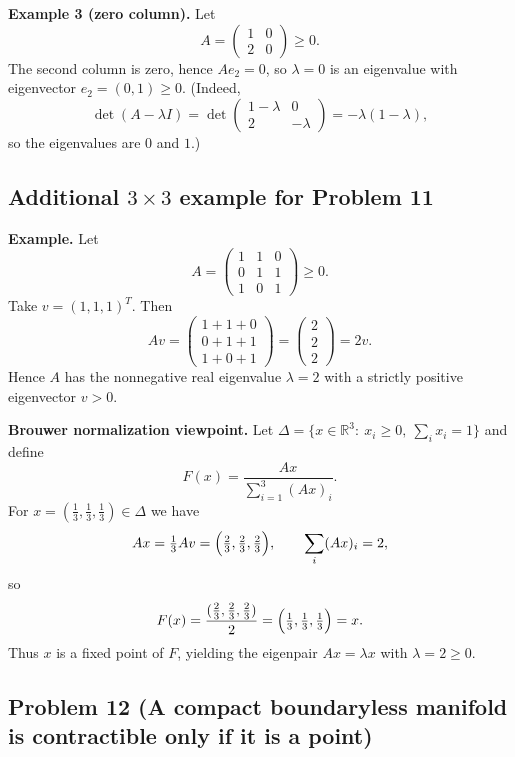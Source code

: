 \documentclass[12pt,a4paper]{article}
\theoremstyle{plain}
\theoremstyle{definition}      %
\begin{document}
\medskip
\noindent\textbf{Example 3 (zero column).}
Let
\[
A=\begin{pmatrix}1&0\\2&0\end{pmatrix}\ge 0.
\]
The second column is zero, hence $Ae_2=0$, so $\lambda=0$ is an eigenvalue with eigenvector $e_2=(0,1)\ge 0$.
(Indeed,
\[
\det(A-\lambda I)=\det\begin{pmatrix}1-\lambda&0\\2&-\lambda\end{pmatrix}=-\lambda(1-\lambda),
\]
so the eigenvalues are $0$ and $1$.)

\subsection*{Additional $3\times 3$ example for Problem 11}

\noindent\textbf{Example.}
Let
\[
A=\begin{pmatrix}
	1&1&0\\
	0&1&1\\
	1&0&1
\end{pmatrix}\ge 0.
\]
Take $v=(1,1,1)^T$. Then
\[
Av=
\begin{pmatrix}
	1+1+0\\
	0+1+1\\
	1+0+1
\end{pmatrix}
=
\begin{pmatrix}
	2\\2\\2
\end{pmatrix}
=2v.
\]
Hence $A$ has the nonnegative real eigenvalue $\lambda=2$ with a strictly positive eigenvector $v>0$.

\medskip
\noindent\textbf{Brouwer normalization viewpoint.}
Let $\Delta=\{x\in\mathbb{R}^3:\ x_i\ge 0,\ \sum_i x_i=1\}$ and define
\[
F(x)=\frac{Ax}{\sum_{i=1}^3 (Ax)_i}.
\]
For $x=(\tfrac13,\tfrac13,\tfrac13)\in\Delta$ we have
\[
Ax=\tfrac13 Av=\Bigl(\tfrac23,\tfrac23,\tfrac23\Bigr),\qquad \sum_i (Ax)_i = 2,
\]
so
\[
F(x)=\frac{(\tfrac23,\tfrac23,\tfrac23)}{2}=\Bigl(\tfrac13,\tfrac13,\tfrac13\Bigr)=x.
\]
Thus $x$ is a fixed point of $F$, yielding the eigenpair $Ax=\lambda x$ with $\lambda=2\ge 0$.


\subsection*{Problem 12 (A compact boundaryless manifold is contractible only if it is a point)}
\end{document}
